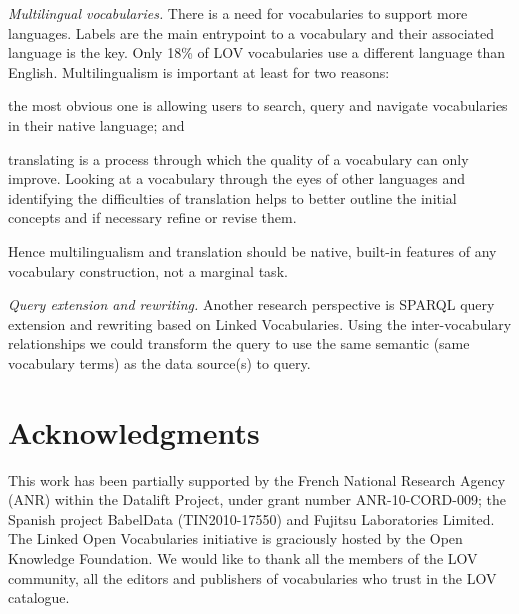 \documentclass{iosart2c}
\begin{document}
\emph{Multilingual vocabularies.} There is a need for vocabularies to support more languages. Labels are the main entrypoint to a vocabulary and their associated language is the key. Only 18\% of LOV vocabularies use a different language than English. Multilingualism is important at least for two reasons: 
\begin{inparaenum}[1)] 
	\item the most obvious one is allowing users to search, query and navigate vocabularies in their native language; and
	\item translating is a process through which the quality of a vocabulary can only improve. Looking at a vocabulary through the eyes of other languages and identifying the difficulties of translation helps to better outline the initial concepts and if necessary refine or revise them. 
\end{inparaenum} 
Hence multilingualism and translation should be native, built-in features of any vocabulary construction, not a marginal task.

\emph{Query extension and rewriting.} Another research perspective is SPARQL query extension and rewriting based on Linked Vocabularies. Using the inter-vocabulary relationships we could transform the query to use the same semantic (same vocabulary terms) as the data source(s) to query.

\section*{Acknowledgments}
This work has been partially supported by the French National Research Agency (ANR) within the Datalift Project, under grant number ANR-10-CORD-009; the Spanish project BabelData (TIN2010-17550) and Fujitsu Laboratories Limited. The Linked Open Vocabularies initiative is graciously hosted by the Open Knowledge Foundation. We would like to thank all the members of the LOV community, all the editors and publishers of vocabularies who trust in the LOV catalogue. 




\end{document}
